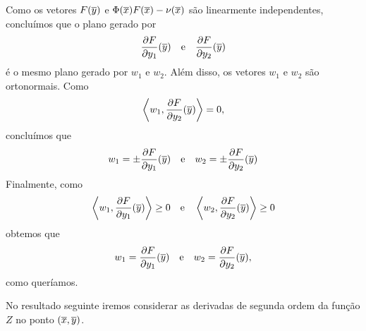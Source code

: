\begin{demonstracao}
	Como os vetores $F(\overline{y})$ e $ \Phi(\overline{x}) F(\overline{x}) - \nu(\overline{x})$
	são linearmente independentes, conclu\'imos que o plano gerado por
	\begin{equation*}
	\frac{\partial F}{\partial y_1}(\overline{y}) \quad \text{e} \quad 
	\frac{\partial F}{\partial y_2}(\overline{y})
	\end{equation*}
	é o mesmo plano gerado por $w_1$ e $w_2$. Al\'em disso, os vetores
	$w_1$ e $w_2$ s\~ao ortonormais. Como
	\begin{equation*}
	\left\langle w_1, \frac{\partial F}{\partial y_2}(\overline{y}) \right\rangle = 0,
	\end{equation*}
	conclu\'imos que
	\begin{equation*}
	w_1 = \pm \frac{\partial F}{\partial y_1}(\overline{y}) 
	\quad \text{e} \quad 
	w_2 = \pm \frac{\partial F}{\partial y_2}(\overline{y})
	\end{equation*}
	Finalmente, como
	\begin{equation*}
	\left\langle w_1, \frac{\partial F}{\partial y_1}(\overline{y}) \right\rangle \geq 0 
	\quad \text{e} \quad 
	\left\langle w_2, \frac{\partial F}{\partial y_2}(\overline{y}) \right\rangle \geq 0
	\end{equation*}	
	obtemos que
	\begin{equation*}
	w_1 = \frac{\partial F}{\partial y_1}(\overline{y}) \quad \text{e} \quad 
	w_2 = \frac{\partial F}{\partial y_2}(\overline{y}),
	\end{equation*}
	como quer\'iamos.
\end{demonstracao}

No resultado seguinte iremos considerar as derivadas de segunda
ordem da fun\c c\~ao $Z$ no ponto $(\overline{x},\overline{y})$.

